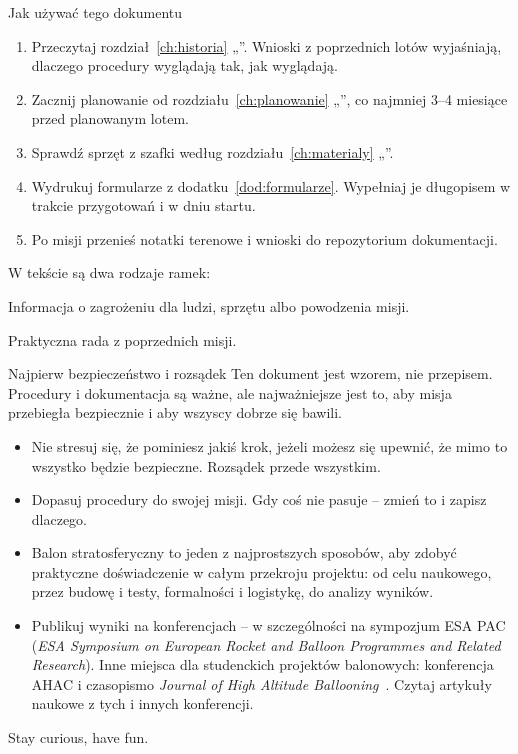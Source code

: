 \begin{sekcja}{Jak używać tego dokumentu}
\begin{enumerate}
  \item Przeczytaj rozdział~\ref{ch:historia} „”. Wnioski z poprzednich lotów wyjaśniają, dlaczego procedury wyglądają tak, jak wyglądają.
  \item Zacznij planowanie od rozdziału~\ref{ch:planowanie} „”, co najmniej 3--4 miesiące przed planowanym lotem.
  \item Sprawdź sprzęt z szafki według rozdziału~\ref{ch:materialy} „”.
  \item Wydrukuj formularze z dodatku~\ref{dod:formularze}. Wypełniaj je długopisem w trakcie przygotowań i w dniu startu.
  \item Po misji przenieś notatki terenowe i wnioski do repozytorium dokumentacji.
\end{enumerate}

W tekście są dwa rodzaje ramek:

\begin{uwaga}Informacja o zagrożeniu dla ludzi, sprzętu albo powodzenia misji.\end{uwaga}

\begin{wskazowka}Praktyczna rada z poprzednich misji.\end{wskazowka}
\end{sekcja}

\begin{sekcja}{Najpierw bezpieczeństwo i rozsądek}
Ten dokument jest wzorem, nie przepisem. Procedury i dokumentacja są ważne, ale najważniejsze jest to, aby misja przebiegła bezpiecznie i aby wszyscy dobrze się bawili.

\begin{itemize}
  \item Nie stresuj się, że pominiesz jakiś krok, jeżeli możesz się upewnić, że mimo to wszystko będzie bezpieczne. Rozsądek przede wszystkim.
  \item Dopasuj procedury do swojej misji. Gdy coś nie pasuje -- zmień to i zapisz dlaczego.
  \item Balon stratosferyczny to jeden z najprostszych sposobów, aby zdobyć praktyczne doświadczenie w całym przekroju projektu: od celu naukowego, przez budowę i testy, formalności i logistykę, do analizy wyników.
  \item Publikuj wyniki na konferencjach -- w szczególności na sympozjum ESA PAC (\emph{ESA Symposium on European Rocket and Balloon Programmes and Related Research}). Inne miejsca dla studenckich projektów balonowych: konferencja AHAC i czasopismo \emph{Journal of High Altitude Ballooning}~\cite{sba}. Czytaj artykuły naukowe z tych i innych konferencji.
\end{itemize}

\begin{center}\sffamily\large\color{sdorange} Stay curious, have fun.\end{center}
\end{sekcja}

